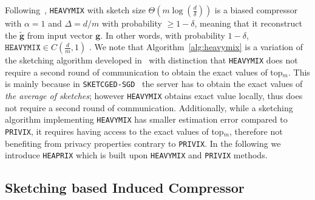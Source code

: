 \documentclass[11pt]{article}
\newtheorem{lemma}{Lemma}
\begin{document}
Following~\cite{ivkin2019communication}, \texttt{HEAVYMIX} with sketch size $\Theta\left(m\log\left(\frac{d}{\delta}\right)\right)$ is a biased compressor with $\alpha=1$ and  $\Delta=d/m$ with probability $\geq1-\delta$, meaning that it reconstruct the $\tilde{\mathbf{g}}$ from input vector $\mathbf{g}$. In other words, with probability $1-\delta$, $\texttt{HEAVYMIX}\in C(\frac{d}{m},1)$ . 
We note that Algorithm~\ref{alg:heavymix} is a variation of the sketching algorithm developed in~\cite{ivkin2019communication} with distinction that \texttt{HEAVYMIX} does not require a second round of communication to obtain the exact values of top$_m$.
This is mainly because in \texttt{SKETCGED-SGD}~\cite{ivkin2019communication} the server has to obtain the exact values of \emph{the average of sketches}; however \texttt{HEAVYMIX} obtains exact value locally, thus does not require a second round of communication.
Additionally, while a sketching algorithm implementing \texttt{HEAVYMIX} has smaller estimation error compared to \texttt{PRIVIX}, it requires having access to the exact values of top$_m$, therefore not benefiting from privacy properties contrary to \texttt{PRIVIX}. 
In the following we introduce \texttt{HEAPRIX} which is built upon \texttt{HEAVYMIX} and \texttt{PRIVIX} methods.

\vspace{-0.05in}
\subsection{Sketching based Induced Compressor}
\vspace{-0.05in}
\end{document}
